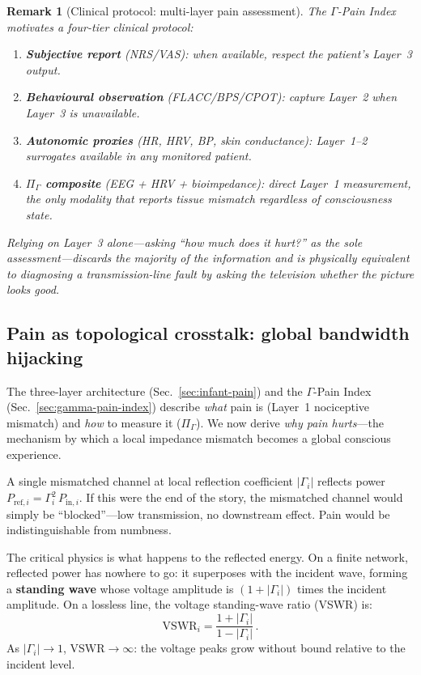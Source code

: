 \documentclass[aps,pre,twocolumn,superscriptaddress,floatfix]{revtex4-2}
\newtheorem{remark}{Remark}
\begin{document}
\begin{remark}[Clinical protocol: multi-layer pain assessment]
The $\Gamma$-Pain Index motivates a four-tier clinical
protocol:
\begin{enumerate}
  \item \textbf{Subjective report} (NRS/VAS):
    when available, respect the patient's Layer~3 output.
  \item \textbf{Behavioural observation}
    (FLACC/BPS/CPOT): capture Layer~2 when Layer~3 is
    unavailable.
  \item \textbf{Autonomic proxies}
    (HR, HRV, BP, skin conductance): Layer~1--2 surrogates
    available in any monitored patient.
  \item \textbf{$\Pi_{\Gamma}$ composite}
    (EEG + HRV + bioimpedance): direct Layer~1
    measurement, the only modality that reports tissue
    mismatch \emph{regardless of consciousness state}.
\end{enumerate}
Relying on Layer~3 alone---asking ``how much does it
hurt?'' as the sole assessment---discards the majority
of the information and is physically equivalent to
diagnosing a transmission-line fault by asking the
television whether the picture looks good.
\end{remark}


\subsection{Pain as topological crosstalk:
  global bandwidth hijacking}
\label{sec:topological-crosstalk}

The three-layer architecture
(Sec.~\ref{sec:infant-pain}) and the $\Gamma$-Pain Index
(Sec.~\ref{sec:gamma-pain-index}) describe
\emph{what} pain is (Layer~1 nociceptive mismatch)
and \emph{how} to measure it ($\Pi_\Gamma$).
We now derive \emph{why pain hurts}---the mechanism by
which a local impedance mismatch becomes a global
conscious experience.

A single mismatched channel at local reflection
coefficient $|\Gamma_i|$ reflects power
$P_{\text{ref},i} = \Gamma_i^2\,P_{\text{in},i}$.
If this were the end of the story, the mismatched
channel would simply be ``blocked''---low transmission,
no downstream effect.
Pain would be indistinguishable from numbness.

The critical physics is what happens to the reflected
energy.
On a finite network, reflected power has nowhere to go:
it superposes with the incident wave, forming a
\textbf{standing wave} whose voltage amplitude is
$(1+|\Gamma_i|)$ times the incident amplitude.
On a lossless line, the voltage standing-wave ratio
(VSWR) is:
\begin{equation}
  \mathrm{VSWR}_i = \frac{1 + |\Gamma_i|}{1 - |\Gamma_i|}\,.
  \label{eq:vswr}
\end{equation}
As $|\Gamma_i|\to 1$, $\mathrm{VSWR}\to\infty$: the
voltage peaks grow without bound relative to the incident
level.
\end{document}
